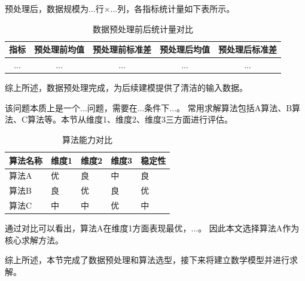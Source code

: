 预处理后，数据规模为...行×...列，各指标统计量如下表所示。

\begin{table}[H]
  \centering
  \caption{数据预处理前后统计量对比}
  \begin{tabularx}{\textwidth}{CCCCC}
    \toprule
    指标 & 预处理前均值 & 预处理前标准差 & 预处理后均值 & 预处理后标准差 \\
    \midrule
    ... & ... & ... & ... & ... \\
    \bottomrule
  \end{tabularx}
  \label{tab:预处理对比}
\end{table}

综上所述，数据预处理完成，为后续建模提供了清洁的输入数据。

该问题本质上是一个...问题，需要在...条件下...。
常用求解算法包括A算法、B算法、C算法等。本节从维度1、维度2、维度3三方面进行评估。

\begin{table}[H]
  \centering
  \caption{算法能力对比}
  \begin{tabularx}{\textwidth}{>{\hsize=2.5\hsize}X>{\hsize=0.6\hsize}X>{\hsize=0.6\hsize}X>{\hsize=0.6\hsize}X>{\hsize=0.7\hsize}X}
    \toprule
    算法名称 & 维度1 & 维度2 & 维度3 & 稳定性 \\
    \midrule
    算法A & 优 & 良 & 中 & 良 \\
    算法B & 良 & 优 & 良 & 优 \\
    算法C & 中 & 中 & 优 & 中 \\
    \bottomrule
  \end{tabularx}
  \label{tab:算法对比1}
\end{table}

通过对比可以看出，算法A在维度1方面表现最优，...。
因此本文选择算法A作为核心求解方法。

综上所述，本节完成了数据预处理和算法选型，接下来将建立数学模型并进行求解。
